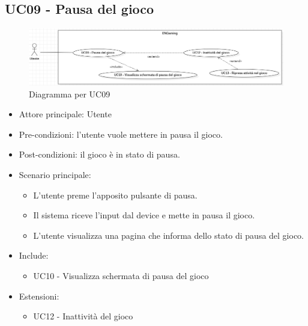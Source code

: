 \subsection{UC09 - Pausa del gioco}
\begin{figure}[h]
    \centering
    \includegraphics[width=400pt]{images/usecase/UC09.png}
    \caption{Diagramma per UC09}
    \label{fig:attore}
\end{figure}
\begin{itemize}
    \item Attore principale: Utente
    \item Pre-condizioni: l'utente vuole mettere in pausa il gioco.
    \item Post-condizioni: il gioco è in stato di pausa.
    \item Scenario principale: \begin{itemize}
        \item L'utente preme l'apposito pulsante di pausa.
        \item Il sistema riceve l'input dal device e mette in pausa il gioco.
        \item L'utente visualizza una pagina che informa dello stato di pausa del gioco.
    \end{itemize}
    \item Include: \begin{itemize}
        \item UC10 - Visualizza schermata di pausa del gioco
    \end{itemize}
    \item Estensioni: \begin{itemize}
        \item UC12 - Inattività del gioco
    \end{itemize}
\end{itemize}

